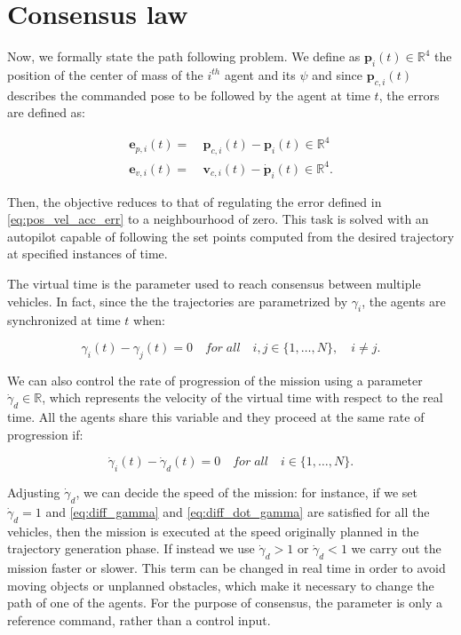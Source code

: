 \section{Consensus law\label{sec:consensus_law}}

Now, we formally state the path following problem. We define as $\bm{p}_i(t) \in \mathbb{R}^4$
the position of the center of mass of the $i^{th}$ agent and its $\psi$ and since $\bm{p}_{c,i}(t)$
describes the commanded pose to be followed by the agent at time $t$, the errors
are defined as:

\begin{equation}  \label{eq:pos_vel_acc_err}
  \begin{aligned}
  \bm{e}_{p,i}(t) = \ & \bm{p}_{c,i}(t) - \bm{p}_i(t) \in  \mathbb{R}^4\\
  \bm{e}_{v,i}(t) = \ & \bm{v}_{c,i}(t) - \dot{\bm{p}}_i(t) \in  \mathbb{R}^4.
  \end{aligned}
\end{equation}

Then, the objective reduces to that of regulating the error defined in \eqref{eq:pos_vel_acc_err}
to a neighbourhood of zero.
This task is solved with an autopilot capable of following the set points computed
from the desired trajectory at specified instances of time.

The virtual time is the parameter used to reach consensus between multiple vehicles.
In fact, since the the trajectories are parametrized by $\gamma_i$, the agents are
synchronized at time $t$ when:

\begin{equation} \label{eq:diff_gamma}
  \gamma_i(t) - \gamma_j(t) = 0 \quad for \; all \quad i,j \in \{1 , \dots , N\}, \quad i \neq j.
\end{equation}

We can also control the rate of progression of the mission using a parameter
$\dot{\gamma}_d \in \mathbb{R}$, which represents the velocity of the virtual time
with respect to the real time. All the agents share this variable and they proceed
at the same rate of progression if:

\begin{equation} \label{eq:diff_dot_gamma}
  \dot{\gamma}_i(t) - \dot{\gamma}_d(t) = 0 \quad for \; all \quad i \in \{1 , \dots , N\}.
\end{equation}

Adjusting $\dot{\gamma}_d$, we can decide the speed of the mission: for instance,
if we set $\dot{\gamma}_d = 1$ and \eqref{eq:diff_gamma} and \eqref{eq:diff_dot_gamma}
are satisfied for all the vehicles, then the mission is executed at the speed
originally planned in the trajectory generation phase.
If instead we use $\dot{\gamma}_d > 1$ or $\dot{\gamma}_d < 1$ we carry out the
mission faster or slower.
This term can be changed in real time in order to avoid moving objects or
unplanned obstacles, which make it necessary to change the path of one of the agents.
For the purpose of consensus, the parameter is only a reference command,
rather than a control input.

